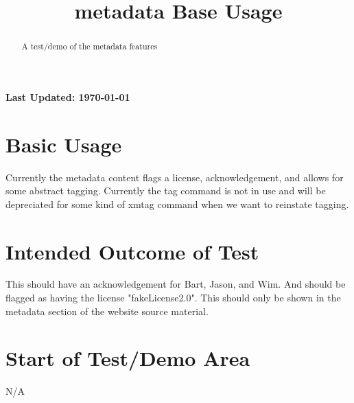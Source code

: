 \documentclass{ximera}
\title{metadata Base Usage}
\begin{document}
\begin{abstract}
    A test/demo of the metadata features
\end{abstract}
\maketitle

{{\Huge \bfseries Last Updated: \today}} \\


\section{Basic Usage}
Currently the metadata content flags a license, acknowledgement, and allows for some abstract tagging. 
Currently the tag command is not in use and will be depreciated for some kind of xmtag command when we want to reinstate tagging.

\section{Intended Outcome of Test}
This should have an acknowledgement for Bart, Jason, and Wim. And should be flagged as having the license "fakeLicense2.0".
This should only be shown in the metadata section of the website source material.

\section{Start of Test/Demo Area}
N/A

\hrulefill
\end{document}
